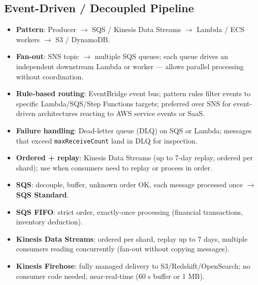 \subsection{Event-Driven / Decoupled Pipeline}

\begin{keyfacts}
\begin{itemize}
  \item \textbf{Pattern}: Producer $\to$ SQS / Kinesis Data Streams $\to$ Lambda / ECS
        workers $\to$ S3 / DynamoDB.
  \item \textbf{Fan-out}: SNS topic $\to$ multiple SQS queues; each queue drives an
        independent downstream Lambda or worker — allows parallel processing without
        coordination.
  \item \textbf{Rule-based routing}: EventBridge event bus; pattern rules filter events to
        specific Lambda/SQS/Step Functions targets; preferred over SNS for event-driven
        architectures reacting to AWS service events or SaaS.
  \item \textbf{Failure handling}: Dead-letter queue (DLQ) on SQS or Lambda; messages that
        exceed \texttt{maxReceiveCount} land in DLQ for inspection.
  \item \textbf{Ordered + replay}: Kinesis Data Streams (up to 7-day replay, ordered per
        shard); use when consumers need to replay or process in order.
\end{itemize}
\end{keyfacts}

\begin{examtip}[title={[!] SQS vs Kinesis decision}]
\begin{itemize}
  \item \textbf{SQS}: decouple, buffer, unknown order OK, each message processed once $\to$
        \textbf{SQS Standard}.
  \item \textbf{SQS FIFO}: strict order, exactly-once processing (financial transactions,
        inventory deduction).
  \item \textbf{Kinesis Data Streams}: ordered per shard, replay up to 7 days, multiple
        consumers reading concurrently (fan-out without copying messages).
  \item \textbf{Kinesis Firehose}: fully managed delivery to S3/Redshift/OpenSearch; no
        consumer code needed; near-real-time (60 s buffer or 1 MB).
\end{itemize}
\end{examtip}

